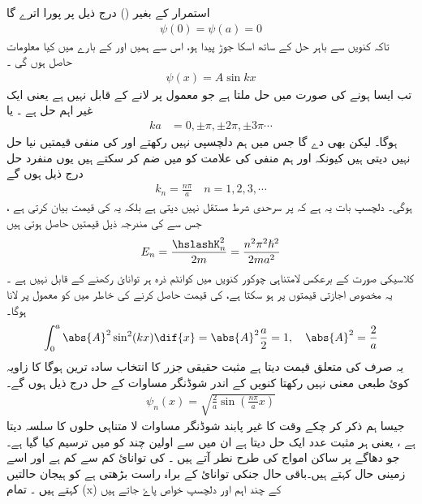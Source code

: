 استمرار کے بغیر () درج ذیل پر پورا اترے گا 
\begin{align}
\psi(0)=\psi(a)=0
\end{align} 
تاکہ کنویں سے باہر حل کے ساتھ اسکا جوڑ پیدا ہو، اس سے ہمیں  اور  کے بارے میں کیا معلومات حاصل ہوں گی ۔
\begin{align}
\psi(x)=A\sin kx
\end{align}
تب       ایسا ہونے کی صورت میں حل   ملتا ہے جو معمول پر لانے کے قابل نہیں ہے یعنی ایک غیر اہم حل ہے ۔  یا  
\begin{align}
ka&=0,\pm\pi,\pm2\pi,\pm3\pi\cdots
\end{align} 
ہوگا۔ لیکن   بھی   دے گا جس میں ہم دلچسپی نہیں رکھتے اور    کی منفی قیمتیں نیا حل نہیں دیتی ہیں کیونکہ     اور ہم منفی کی علامت کو   میں ضم کر سکتے ہیں یوں منفرد حل درج ذیل ہوں گے 
\begin{align}
k_{n}=\frac{n\pi}{a}\quad n=1,2,3,\cdots
\end{align}
ہوگی۔ دلچسپ بات یہ ہے کہ  پر سرحدی شرط مستقل    نہیں دیتی ہے بلکہ یہ     کی قیمت بیان کرتی ہے ، جس سے    کی مندرجہ ذیل قیمتیں حاصل ہوتی ہیں
\begin{align}
E_{n}=\frac{\hslashK^{2}_{n}}{2m}=\frac{n^{2}\pi^{2}\hslash^{2}}{2ma^{2}}
\end{align} 
کلاسیکی صورت کے برعکس لامتناہی چوکور کنویں میں کوانٹم ذرہ ہر توانائ رکھنے کے قابل نہیں ہے ۔ یہ مخصوص اجازتی قیمتوں پر ہو سکتا ہے،    کی قیمت حاصل کرنے کی خاطر میں   کو معمول پر لانا ہوگا۔ 
\begin{align}
\int_{0}^{a}\abs{A}^{2}\sin^{2}(kx)\dif{x}=\abs{A}^{2}\frac{a}{2}=1, \quad \abs{A}^{2}=\frac{2}{a}
\end{align} 
یہ صرف    کی متعلق قیمت دیتا ہے مثبت حقیقی جزر کا انتخاب سادہ ترین ہوگا       کا زاویہ کوئ طبعی معنی نہیں رکھتا کنویں کے اندر شوڈنگر مساوات کے حل درج ذیل ہوں گے۔
\begin{align}
\psi_{n}(x)=\sqrt{\frac{2}{a}\sin(\frac{n\pi}{a}x)}
\end{align}
جیسا ہم ذکر کر چکے وقت کا غیر پابند شوڈنگر مساوات لا متناہی حلوں کا سلسہ دیتا ہے ، یعنی ہر مثبت عدد ایک حل دیتا ہے ان میں سے اولین چند کو  میں ترسیم کیا گیا ہے۔ جو دھاگے پر ساکن امواج کی طرح نطر آتے ہیں ۔       کی توانائ کم سے کم ہے اور اسے زمینی حال کہتے ہیں۔باقی حال جنکی توانائ     کے براہ راست بڑھتی ہے کو ہیجان حالتیں کہتے ہیں ۔ تمام \psi(x) کے چند اہم اور دلچسپ خواص پاۓ جاتے ہیں
